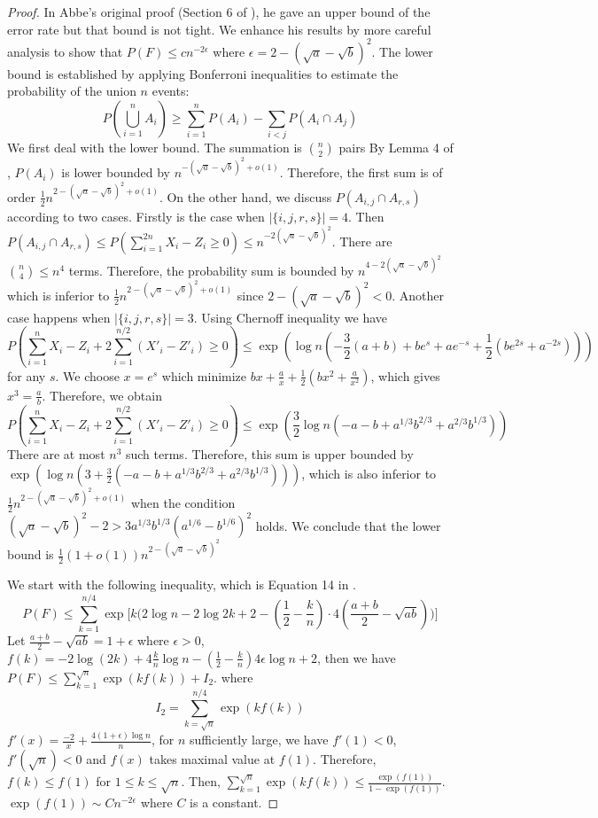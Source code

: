 \documentclass{article}
\begin{document}
\begin{proof}
	In Abbe's original proof (Section 6 of \cite{abbe}), he gave an upper bound of the error rate but that bound is not tight.
	We enhance his results by more careful analysis to show that $P(F) \leq cn^{-2\epsilon}$
	where $\epsilon=2-(\sqrt{a} - \sqrt{b})^2$. The lower bound is established by applying
	Bonferroni inequalities to estimate the probability of the union $n$ events:
	$$
	P(\bigcup_{i=1}^n A_i) \geq \sum_{i=1}^n P(A_i) - \sum_{i<j} P(A_i \cap A_j)
	$$
	We first deal with the lower bound. The summation is $\binom{n}{2}$ pairs
	By Lemma 4 of \cite{abbe}, $P(A_i)$ is lower bounded by $n^{-(\sqrt{a} - \sqrt{b})^2 +o(1)}$.
	Therefore, the first sum is of order $\frac{1}{2}n^{2-(\sqrt{a} - \sqrt{b})^2 +o(1)}$.
	On the other hand, we discuss $P(A_{i,j} \cap A_{r,s})$ according to two cases.
	Firstly is the case when $|\{i,j,r,s\}|=4$. Then $P(A_{i,j} \cap A_{r,s}) \leq
	P(\sum_{i=1}^{2n} X_i - Z_i \geq 0) \leq n^{-2(\sqrt{a} - \sqrt{b})^2} $. There are
	$\binom{n}{4} \leq n^4$ terms. Therefore, the probability sum
	is bounded by $n^{4-2(\sqrt{a} - \sqrt{b})^2}$ which is inferior to $\frac{1}{2}n^{2-(\sqrt{a} - \sqrt{b})^2 +o(1)}$ since $2-(\sqrt{a} - \sqrt{b})^2 < 0$.
	Another case happens when $|\{i,j,r,s\}|=3$. Using Chernoff inequality we have
	$$
	P(\sum_{i=1}^{n} X_i - Z_i + 2\sum_{i=1}^{n/2} (X'_i - Z'_i) \geq 0) \leq \exp(\log n (-\frac{3}{2}(a+b) +be^s+ae^{-s} +\frac{1}{2}(be^{2s}+a^{-2s})))
	$$
	for any $s$.
	We choose $x=e^s$ which minimize $bx+\frac{a}{x}+\frac{1}{2}(bx^2+\frac{a}{x^2})$, which gives $x^3=\frac{a}{b}$.
	Therefore, we obtain
	$$
P(\sum_{i=1}^{n} X_i - Z_i + 2\sum_{i=1}^{n/2} (X'_i - Z'_i) \geq 0) \leq \exp(\frac{3}{2}\log n (-a-b+a^{1/3}b^{2/3}+a^{2/3}b^{1/3}))
$$		
 There are at most $n^3$ such terms. Therefore,
	this sum is upper bounded by  $\exp(\log n (3+\frac{3}{2}(-a-b+a^{1/3}b^{2/3}+a^{2/3}b^{1/3})))$, which is also inferior
	to  $\frac{1}{2}n^{2-(\sqrt{a} - \sqrt{b})^2 +o(1)}$ when the condition
	$(\sqrt{a}-\sqrt{b})^2-2 > 3a^{1/3}b^{1/3}(a^{1/6}-b^{1/6})^2$ holds. We conclude that the lower bound
	is $\frac{1}{2}(1+o(1))n^{2-(\sqrt{a} - \sqrt{b})^2}$
	
	We start with the following inequality, which is Equation 14 in \cite{abbe}.
	\begin{equation}
	P(F) \leq \sum_{k=1}^{n/4} \exp \Big[k\Big( 2\log n - 2 \log 2k + 2 - (\frac{1}{2} - \frac{k}{n})\cdot 4(\frac{a+b}{2} - \sqrt{ab})  \Big)\Big]
	\end{equation}
	Let $\frac{a+b}{2} - \sqrt{ab} = 1 + \epsilon$ where $\epsilon > 0$, $f(k) = -2\log(2k) + 4\frac{k}{n} \log n - (\frac{1}{2} - \frac{k}{n}) 4\epsilon \log n + 2$,
	then we have
	$P(F)\leq \sum_{k=1}^{\sqrt{n}} \exp(kf(k)) + I_2$. where
	\begin{equation}
	I_2 = \sum_{k=\sqrt{n}}^{n/4}\exp(kf(k))
	\end{equation}
	$f'(x) = \frac{-2}{x} + \frac{4(1+\epsilon)\log n}{n}$, for $n$ sufficiently large, we have $f'(1) < 0$, $f'(\sqrt{n})<0$ and $f(x)$ takes maximal value
	at $f(1)$. Therefore, $f(k)\leq f(1)$ for $1\leq k \leq \sqrt{n}$. Then,
	$\sum_{k=1}^{\sqrt{n}} \exp(kf(k)) \leq \frac{\exp(f(1))}{1-\exp(f(1))}$. $\exp(f(1))\sim C n^{-2\epsilon}$ where $C$ is a constant.
	

\end{proof}
\end{document}

